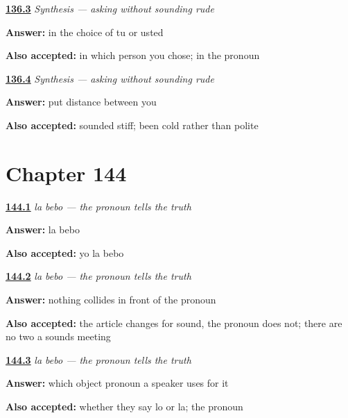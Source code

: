 \noindent\begin{minipage}[t]{\linewidth}
\raggedright
\hyperlink{review-ES-C50-sintesis-pedir-bien-where}{\textbf{136.3}} \emph{Synthesis — asking without sounding rude}\par
\small \textbf{Answer:} in the choice of tu or usted\par
\footnotesize \textbf{Also accepted:} in which person you chose; in the pronoun
\end{minipage}\par\medskip

\noindent\begin{minipage}[t]{\linewidth}
\raggedright
\hyperlink{review-ES-C50-sintesis-pedir-bien-mistake}{\textbf{136.4}} \emph{Synthesis — asking without sounding rude}\par
\small \textbf{Answer:} put distance between you\par
\footnotesize \textbf{Also accepted:} sounded stiff; been cold rather than polite
\end{minipage}\par\medskip

\section*{Chapter 144}

\noindent\begin{minipage}[t]{\linewidth}
\raggedright
\hyperlink{review-ES-C55-la-bebo-drink}{\textbf{144.1}} \emph{la bebo — the pronoun tells the truth}\par
\small \textbf{Answer:} la bebo\par
\footnotesize \textbf{Also accepted:} yo la bebo
\end{minipage}\par\medskip

\noindent\begin{minipage}[t]{\linewidth}
\raggedright
\hyperlink{review-ES-C55-la-bebo-why}{\textbf{144.2}} \emph{la bebo — the pronoun tells the truth}\par
\small \textbf{Answer:} nothing collides in front of the pronoun\par
\footnotesize \textbf{Also accepted:} the article changes for sound, the pronoun does not; there are no two a sounds meeting
\end{minipage}\par\medskip

\noindent\begin{minipage}[t]{\linewidth}
\raggedright
\hyperlink{review-ES-C55-la-bebo-test}{\textbf{144.3}} \emph{la bebo — the pronoun tells the truth}\par
\small \textbf{Answer:} which object pronoun a speaker uses for it\par
\footnotesize \textbf{Also accepted:} whether they say lo or la; the pronoun
\end{minipage}\par\medskip

